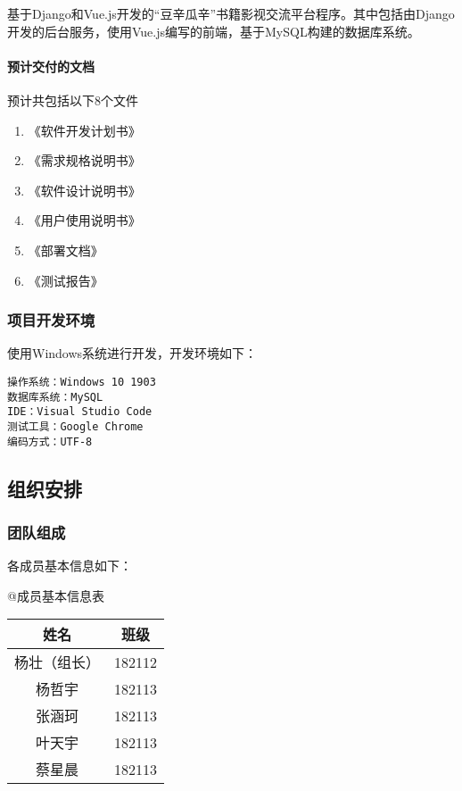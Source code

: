 \documentclass[
]{article}
\begin{document}
基于Django和Vue.js开发的``豆辛瓜辛''书籍影视交流平台程序。其中包括由Django开发的后台服务，使用Vue.js编写的前端，基于MySQL构建的数据库系统。

\hypertarget{header-n3356}{%
\paragraph{预计交付的文档}\label{header-n3356}}

预计共包括以下8个文件

\begin{enumerate}
\def\labelenumi{\arabic{enumi}.}
\item
  《软件开发计划书》
\item
  《需求规格说明书》
\item
  《软件设计说明书》
\item
  《用户使用说明书》
\item
  《部署文档》
\item
  《测试报告》
\end{enumerate}

\hypertarget{header-n3371}{%
\subsubsection{项目开发环境}\label{header-n3371}}

使用Windows系统进行开发，开发环境如下：

\begin{verbatim}
操作系统：Windows 10 1903
数据库系统：MySQL
IDE：Visual Studio Code
测试工具：Google Chrome
编码方式：UTF-8
\end{verbatim}

\hypertarget{header-n3374}{%
\subsection{组织安排}\label{header-n3374}}

\hypertarget{header-n3375}{%
\subsubsection{团队组成}\label{header-n3375}}

各成员基本信息如下：

@成员基本信息表

\begin{longtable}[]{@{}cc@{}}
\toprule
姓名 & 班级\tabularnewline
\midrule
\endhead
杨壮（组长） & 182112\tabularnewline
杨哲宇 & 182113\tabularnewline
张涵珂 & 182113\tabularnewline
叶天宇 & 182113\tabularnewline
蔡星晨 & 182113\tabularnewline
\bottomrule
\end{longtable}
\end{document}
